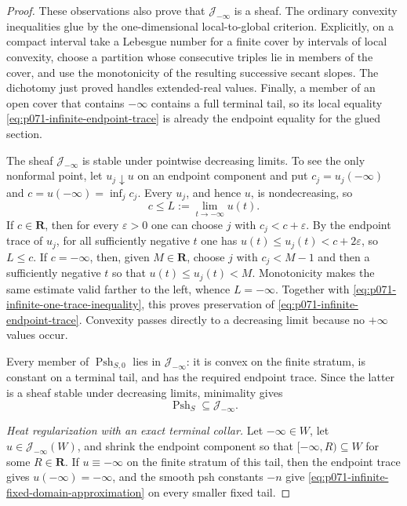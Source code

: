 \begin{proof}
These observations also prove that \(\mathscr J_{-\infty}\) is a sheaf.
The ordinary convexity inequalities glue by the one-dimensional
local-to-global criterion.  Explicitly, on a compact interval take a
Lebesgue number for a finite cover by intervals of local convexity, choose
a partition whose consecutive triples lie in members of the cover, and
use the monotonicity of the resulting successive secant slopes.  The
dichotomy just proved handles extended-real values.  Finally, a member of
an open cover that contains \(-\infty\) contains a full terminal tail, so
its local equality \eqref{eq:p071-infinite-endpoint-trace} is already the
endpoint equality for the glued section.

The sheaf \(\mathscr J_{-\infty}\) is stable under pointwise decreasing
limits.  To see the only nonformal point, let \(u_j\downarrow u\) on an
endpoint component and put \(c_j=u_j(-\infty)\) and
\(c=u(-\infty)=\inf_jc_j\).  Every \(u_j\), and hence \(u\), is
nondecreasing, so
\begin{equation}
 c\leq L:=\lim_{t\to-\infty}u(t).
 \label{eq:p071-infinite-one-trace-inequality}
\end{equation}
If \(c\in\mathbf R\), then for every \(\varepsilon>0\) one can choose
\(j\) with \(c_j<c+\varepsilon\).  By the endpoint trace of \(u_j\), for
all sufficiently negative \(t\) one has
\(u(t)\leq u_j(t)<c+2\varepsilon\), so \(L\leq c\).  If
\(c=-\infty\), then, given \(M\in\mathbf R\), choose \(j\) with
\(c_j<M-1\) and then a sufficiently negative \(t\) so that
\(u(t)\leq u_j(t)<M\).  Monotonicity makes the same estimate valid farther
to the left, whence \(L=-\infty\).  Together with
\eqref{eq:p071-infinite-one-trace-inequality}, this proves preservation of
\eqref{eq:p071-infinite-endpoint-trace}.  Convexity passes directly to a
decreasing limit because no \(+\infty\) values occur.

Every member of \(\operatorname{Psh}_{S,0}\) lies in
\(\mathscr J_{-\infty}\): it is convex on the finite stratum, is constant
on a terminal tail, and has the required endpoint trace.  Since the latter
is a sheaf stable under decreasing limits, minimality gives
\begin{equation}
                 \operatorname{Psh}_S
                    \subseteq\mathscr J_{-\infty}.
 \label{eq:p071-infinite-generated-in-trace-class}
\end{equation}

\medskip\noindent\emph{Heat regularization with an exact terminal collar.}
Let \(-\infty\in W\), let \(u\in\mathscr J_{-\infty}(W)\), and shrink
the endpoint component so that
\([-\infty,R)\subseteq W\) for some \(R\in\mathbf R\).  If
\(u\equiv-\infty\) on the finite stratum of this tail, then the endpoint
trace gives \(u(-\infty)=-\infty\), and the smooth psh constants \(-n\)
give \eqref{eq:p071-infinite-fixed-domain-approximation} on every smaller
fixed tail.


\end{proof}
